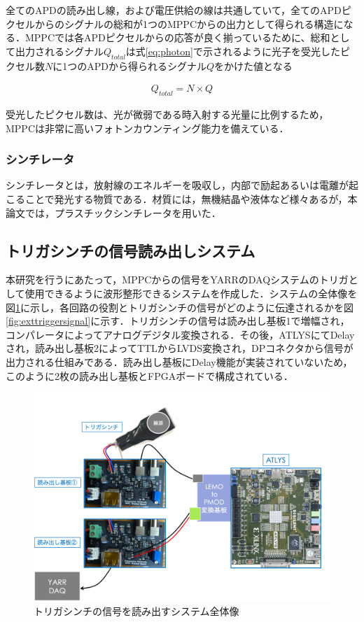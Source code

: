 全てのAPDの読み出し線，および電圧供給の線は共通していて，全てのAPDピクセルからのシグナルの総和が1つのMPPCからの出力として得られる構造になる．MPPCでは各APDピクセルからの応答が良く揃っているために、総和として出力されるシグナル$Q_{total}$は式\ref{eq:photon}で示されるように光子を受光したピクセル数$N$に1つのAPDから得られるシグナル$Q$をかけた値となる

\begin{eqnarray}
  \label{eq:photon}
  Q_{total} = N \times Q
\end{eqnarray}

受光したピクセル数は、光が微弱である時入射する光量に比例するため， MPPCは非常に高いフォトンカウンティング能力を備えている．

\subsubsection*{シンチレータ}
シンチレータとは，放射線のエネルギーを吸収し，内部で励起あるいは電離が起こることで発光する物質である．材質には，無機結晶や液体など様々あるが，本論文では，プラスチックシンチレータを用いた．

\subsection{トリガシンチの信号読み出しシステム}
本研究を行うにあたって，MPPCからの信号をYARRのDAQシステムのトリガとして使用できるように波形整形できるシステムを作成した．システムの全体像を図\ref{fig:exttriggersetup}に示し，各回路の役割とトリガシンチの信号がどのように伝達されるかを図\ref{fig:exttriggersignal}に示す．トリガシンチの信号は読み出し基板1で増幅され，コンパレータによってアナログデジタル変換される．その後，ATLYSにてDelayされ，読み出し基板2によってTTLからLVDS変換され，DPコネクタから信号が出力される仕組みである．読み出し基板にDelay機能が実装されていないため，このように2枚の読み出し基板とFPGAボードで構成されている．

\begin{figure}[h]
  \centering
  \includegraphics[width=15cm]{./figure/exttriggersetup.png}
  \caption{トリガシンチの信号を読み出すシステム全体像}
  \label{fig:exttriggersetup}
\end{figure}

